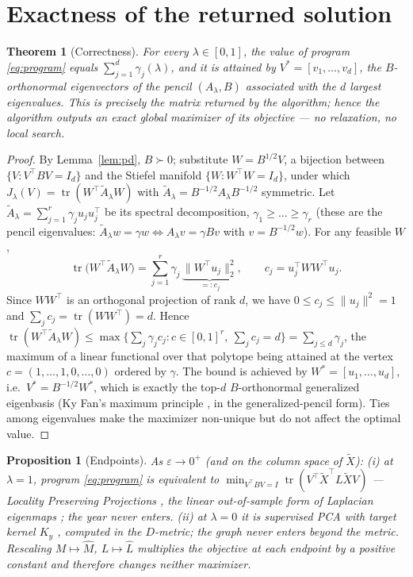 \documentclass[11pt]{article}
\newtheorem{theorem}{Theorem}
\newtheorem{proposition}{Proposition}
\theoremstyle{remark}
\newcommand{\tr}{\operatorname{tr}}
\newcommand{\Xt}{\widetilde{X}}
\newcommand{\Mh}{\widehat{M}}
\newcommand{\Lh}{\widehat{L}}
\begin{document}
\section{Exactness of the returned solution}

\begin{theorem}[Correctness]\label{thm:main}
For every $\lambda\in[0,1]$, the value of program \eqref{eq:program} equals
$\sum_{j=1}^{d}\gamma_j(\lambda)$, and it is attained by
$V^\ast=[v_1,\dots,v_d]$, the $B$-orthonormal eigenvectors of the pencil
$(A_\lambda,B)$ associated with the $d$ largest eigenvalues. This is precisely the
matrix returned by the algorithm; hence the algorithm outputs an exact global maximizer
of its objective --- no relaxation, no local search.
\end{theorem}

\begin{proof}
By Lemma~\ref{lem:pd}, $B\succ0$; substitute $W=B^{1/2}V$, a bijection between
$\{V:V^{\!\top}BV=I_d\}$ and the Stiefel manifold $\{W:W^{\!\top}W=I_d\}$, under which
$J_\lambda(V)=\tr(W^{\!\top}\tilde A_\lambda W)$ with
$\tilde A_\lambda=B^{-1/2}A_\lambda B^{-1/2}$ symmetric. Let
$\tilde A_\lambda=\sum_{j=1}^{r}\gamma_j u_ju_j^{\!\top}$ be its spectral decomposition,
$\gamma_1\ge\dots\ge\gamma_r$ (these are the pencil eigenvalues: $\tilde A_\lambda w=\gamma w
\iff A_\lambda v=\gamma Bv$ with $v=B^{-1/2}w$). For any feasible $W$,
\[
\tr\!\big(W^{\!\top}\tilde A_\lambda W\big)
=\sum_{j=1}^{r}\gamma_j\,\underbrace{\|W^{\!\top}u_j\|_2^2}_{=:c_j},
\qquad
c_j = u_j^{\!\top}WW^{\!\top}u_j .
\]
Since $WW^{\!\top}$ is an orthogonal projection of rank $d$, we have $0\le c_j\le
\|u_j\|^2=1$ and $\sum_j c_j=\tr(WW^{\!\top})=d$. Hence
$\tr(W^{\!\top}\tilde A_\lambda W)\le\max\{\sum_j\gamma_jc_j : c\in[0,1]^r,\ \sum_jc_j=d\}
=\sum_{j\le d}\gamma_j$, the maximum of a linear functional over that polytope being
attained at the vertex $c=(1,\dots,1,0,\dots,0)$ ordered by $\gamma$. The bound is
achieved by $W^\ast=[u_1,\dots,u_d]$, i.e.\ $V^\ast=B^{-1/2}W^\ast$, which is exactly
the top-$d$ $B$-orthonormal generalized eigenbasis (Ky Fan's maximum principle
\cite{fan1949}, in the generalized-pencil form). Ties among eigenvalues make the
maximizer non-unique but do not affect the optimal value.
\end{proof}

\begin{proposition}[Endpoints]\label{prop:limits}
As $\varepsilon\to0^+$ (and on the column space of $\Xt$):
(i) at $\lambda=1$, program \eqref{eq:program} is equivalent to
$\min_{V^{\!\top}BV=I}\tr(V^{\!\top}\Xt^{\!\top}L\Xt V)$ --- Locality Preserving
Projections \cite{he2003lpp}, the linear out-of-sample form of Laplacian eigenmaps
\cite{belkin2003}; the year never enters.
(ii) at $\lambda=0$ it is supervised PCA with target kernel $K_y$
\cite{barshan2011spca}, computed in the $D$-metric; the graph never enters beyond
the metric. Rescaling $M\mapsto\Mh$, $L\mapsto\Lh$ multiplies the objective at each
endpoint by a positive constant and therefore changes neither maximizer.
\end{proposition}
\end{document}
